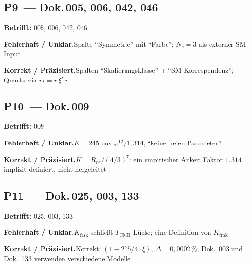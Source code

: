 \medskip


\subsection*{P9~--- Dok.\,005, 006, 042, 046}

\noindent\textbf{Betrifft:} 005, 006, 042, 046


\smallskip\noindent\textbf{Fehlerhaft / Unklar.}\quad Spalte \enquote{Symmetrie} mit \enquote{Farbe}; \newline
  $N_c = 3$ als externer SM-Input


\smallskip\noindent\textbf{Korrekt / Präzisiert.}\quad Spalten \enquote{Skalierungs\-klasse} + \enquote{SM-Korrespondenz}; \newline
  Quarks via $m = r\,\xi^p\,v$


\medskip


\subsection*{P10~--- Dok.\,009}

\noindent\textbf{Betrifft:} 009


\smallskip\noindent\textbf{Fehlerhaft / Unklar.}\quad $K = 245$ aus $\varphi^{12}/1{,}314$; \newline
  \enquote{keine freien Parameter}


\smallskip\noindent\textbf{Korrekt / Präzisiert.}\quad $K = R_{pe}/(4/3)^7$: ein empirischer Anker; \newline
  Faktor $1{,}314$ implizit definiert, nicht hergeleitet


\medskip


\subsection*{P11~--- Dok.\,025, 003, 133}

\noindent\textbf{Betrifft:} 025, 003, 133


\smallskip\noindent\textbf{Fehlerhaft / Unklar.}\quad $K_\text{frak}$ schließt $T_\text{CMB}$-Lücke; \newline
  eine Definition von $K_\text{frak}$


\smallskip\noindent\textbf{Korrekt / Präzisiert.}\quad Korrekt: $(1-275/4\cdot\xi)$, $\Delta=0{,}0002\,\%$; \newline
  Dok.~003 und Dok.~133 verwenden verschiedene Modelle


